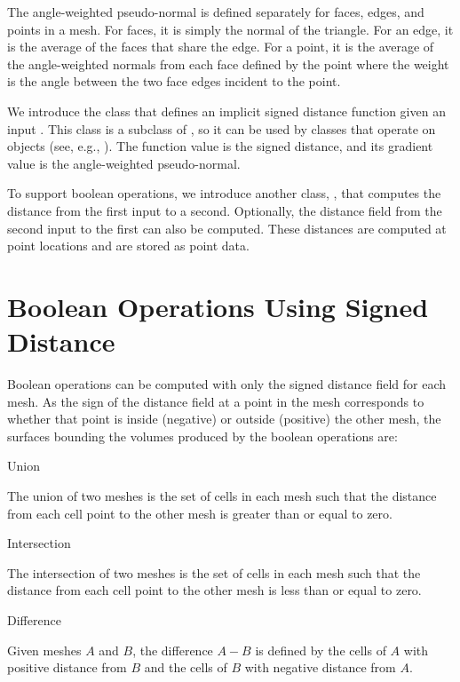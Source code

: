 \documentclass{InsightArticle}
\begin{document}
The angle-weighted pseudo-normal is defined separately for faces, edges, and points in a mesh. For faces, it is simply the normal of the triangle. For an edge, it is the average of the faces that share the edge. For a point, it is the average of the angle-weighted normals from each face defined by the point where the weight is the angle between the two face edges incident to the point.

We introduce the  class that defines an implicit signed distance function given an input . This class is a subclass of , so it can be used by classes that operate on  objects (see, e.g., ). The function value is the signed distance, and its gradient value is the angle-weighted pseudo-normal.

To support boolean operations, we introduce another class, , that computes the distance from the first input  to a second. Optionally, the distance field from the second input  to the first can also be computed. These distances are computed at point locations and are stored as point data.

\section{Boolean Operations Using Signed Distance}

Boolean operations can be computed with only the signed distance field for each mesh. As the sign of the distance field at a point in the mesh corresponds to whether that point is inside (negative) or outside (positive) the other mesh, the surfaces bounding the volumes produced by the boolean operations are:

\begin{description}

\item Union

The union of two meshes is the set of cells in each mesh such that the distance from each cell point to the other mesh is greater than or equal to zero.

\item Intersection

The intersection of two meshes is the set of cells in each mesh such that the distance from each cell point to the other mesh is less than or equal to zero.

\item Difference

Given meshes $A$ and $B$, the difference $A-B$ is defined by the cells of $A$ with positive distance from $B$ and the cells of $B$ with negative distance from $A$.

\end{description}
\end{document}
